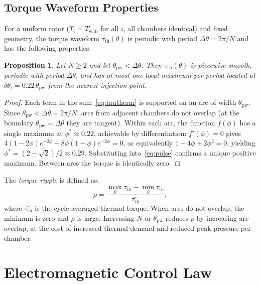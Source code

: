 \documentclass[11pt, a4paper]{article}
\theoremstyle{plain}
\newtheorem{proposition}[theorem]{Proposition}
\theoremstyle{definition}
\newcommand{\Twall}{T_{\mathrm{wall}}}
\newcommand{\tauth}{\tau_{\mathrm{th}}}
\newcommand{\Nch}{N}
\begin{document}
\subsection{Torque Waveform Properties}

For a uniform rotor ($T_i = \Twall$ for all $i$, all chambers identical) and fixed geometry, the torque waveform $\tauth(\theta)$ is periodic with period $\Delta\theta = 2\pi/\Nch$ and has the following properties.

\begin{proposition}
Let $\Nch \geq 2$ and let $\theta_{\mathrm{pw}} < \Delta\theta$. Then $\tauth(\theta)$ is piecewise smooth, periodic with period $\Delta\theta$, and has at most one local maximum per period located at $\delta\theta_i = 0.22\,\theta_{\mathrm{pw}}$ from the nearest injection point.
\end{proposition}

\begin{proof}
Each term in the sum~\eqref{eq:tautherm} is supported on an arc of width $\theta_{\mathrm{pw}}$. Since $\theta_{\mathrm{pw}} < \Delta\theta = 2\pi/\Nch$, arcs from adjacent chambers do not overlap (at the boundary $\theta_{\mathrm{pw}} = \Delta\theta$ they are tangent). Within each arc, the function $f(\phi)$ has a single maximum at $\phi^* \approx 0.22$, achievable by differentiation: $f'(\phi) = 0$ gives $4(1-2\phi)e^{-2\phi} - 8\phi(1-\phi)e^{-2\phi} = 0$, or equivalently $1 - 4\phi + 2\phi^2 = 0$, yielding $\phi^* = (2-\sqrt{2})/2 \approx 0.29$. Substituting into~\eqref{eq:pulse} confirms a unique positive maximum. Between arcs the torque is identically zero.
\end{proof}

The \textit{torque ripple} is defined as:
\begin{equation}
  \rho = \frac{\max_\theta \tauth - \min_\theta \tauth}{\bar{\tauth}},
\end{equation}
where $\bar{\tauth}$ is the cycle-averaged thermal torque. When arcs do not overlap, the minimum is zero and $\rho$ is large. Increasing $\Nch$ or $\theta_{\mathrm{pw}}$ reduces $\rho$ by increasing arc overlap, at the cost of increased thermal demand and reduced peak pressure per chamber.

\section{Electromagnetic Control Law}
\label{sec:em}
\end{document}
